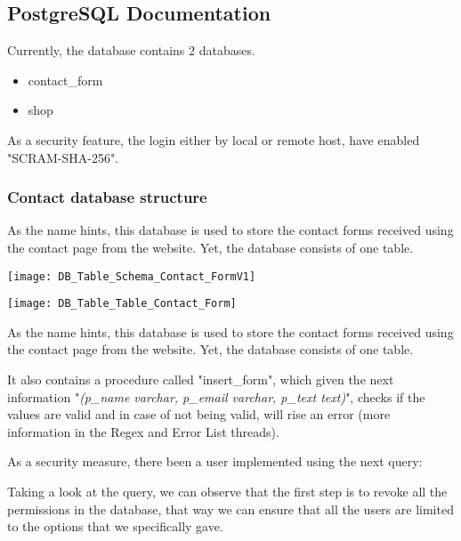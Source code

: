 \subsection{PostgreSQL Documentation}\label{subsec:postgresql-documentation}
\begin{flushleft}
    Currently, the database contains 2 databases.
    \begin{itemize}
        \item contact\_form
        \item shop
    \end{itemize}
    As a security feature, the login either by local or remote host, have enabled "SCRAM-SHA-256".
\end{flushleft}
\subsubsection[Contact database structure]{Contact database structure}
\begin{flushleft}
    As the name hints, this database is used to store the contact forms received using the contact page from the website.
    Yet, the database consists of one table.
\end{flushleft}

\begin{center}
    \texttt{[image: DB\_Table\_Schema\_Contact\_FormV1]}
\end{center}
\begin{center}
    \texttt{[image: DB\_Table\_Table\_Contact\_Form]}
\end{center}

\begin{flushleft}
    As the name hints, this database is used to store the contact forms received using the contact page from the website.
    Yet, the database consists of one table.
\end{flushleft}
\begin{flushleft}
    It also contains a procedure called "insert\_form", which given the next information "\textit{(p\_name varchar,
        p\_email varchar, p\_text text)}", checks if the values are valid and in case of not being valid, will rise an error
    (more information in the Regex and Error List threads).
\end{flushleft}
\begin{flushleft}
    As a security measure, there been a user implemented using the next query:
    
\end{flushleft}
\begin{flushleft}
    Taking a look at the query, we can observe that the first step is to revoke all the permissions in the database,
    that way we can ensure that all the users are limited to the options that we specifically gave.
\end{flushleft}


